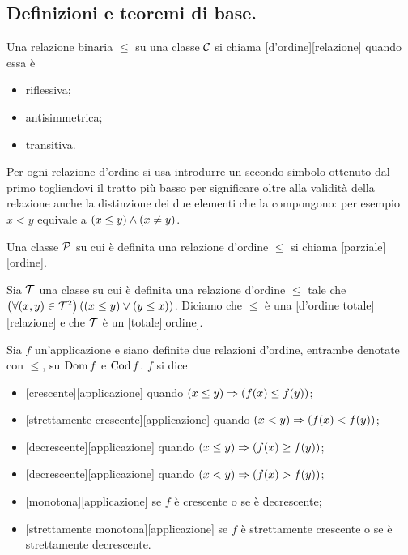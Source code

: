 \subsection{Definizioni e teoremi di base.}\label{DefinizioniETeoremiDiBaseOrdini}
\begin{Definition}
	Una relazione binaria $\leq$ su una classe $\mathcal{C}$ si chiama [d'ordine][relazione] quando essa \`e
	\begin{itemize}
		\item riflessiva;
		\item antisimmetrica;
		\item transitiva.
	\end{itemize}
	Per ogni relazione d'ordine si usa introdurre un secondo simbolo ottenuto dal primo togliendovi il tratto pi\`u basso per significare oltre alla validit\`a della relazione anche la distinzione dei due elementi che la compongono: per esempio $x < y$ equivale a $\left ( x \leq y \right ) \wedge \left ( x \neq y \right )$.
\end{Definition}
\begin{Definition}
	Una classe $\mathcal{P}$ su cui \`e definita una relazione d'ordine $\leq$ si chiama [parziale][ordine].
\end{Definition}
\begin{Definition}
	Sia $\mathcal{T}$ una classe su cui \`e definita una relazione d'ordine $\leq$ tale che $\left ( \forall (x,y) \in \mathcal{T}^2 \right ) \left ( \left ( x \leq y \right ) \vee \left ( y \leq x \right ) \right )$. Diciamo che $\leq$ \`e una [d'ordine totale][relazione] e che $\mathcal{T}$ \`e un [totale][ordine].
\end{Definition}
\begin{Definition}
	Sia $f$ un'applicazione e siano definite due relazioni d'ordine, entrambe denotate con $\leq$, su $\operatorname{Dom}{f}$ e $\operatorname{Cod}{f}$. $f$ si dice
	\begin{itemize}
		\item {}[crescente][applicazione] quando $\left ( x \leq y \right ) \Rightarrow \left ( f(x) \leq f(y) \right )$;
		\item {}[strettamente crescente][applicazione] quando $\left ( x < y \right ) \Rightarrow \left ( f(x) < f(y) \right )$;
		\item {}[decrescente][applicazione] quando $\left ( x \leq y \right ) \Rightarrow \left ( f(x) \geq f(y) \right )$;
		\item {}[decrescente][applicazione] quando $\left ( x < y \right ) \Rightarrow \left ( f(x) > f(y) \right )$;
		\item {}[monotona][applicazione] se $f$ \`e crescente o se \`e decrescente;
		\item {}[strettamente monotona][applicazione] se $f$ \`e strettamente crescente o se \`e strettamente decrescente.
	\end{itemize}
\end{Definition}

